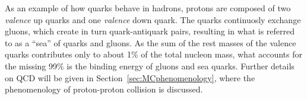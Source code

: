 As an example of how quarks behave in hadrons,
protons are composed of two {\it valence} up quarks
and one {\it valence} down quark. The quarks continuosly
exchange gluons, which create in turn quark-antiquark pairs,
resulting in what is referred to as a ``sea'' 
of quarks and gluons. 
As the sum of the rest masses of the valence quarks contributes 
only to about 1\% of the total nucleon
mass, what accounts for the missing 99\% is the
binding energy of gluons and sea quarks.
Further details on QCD will be given in Section~\ref{sec:MCphenomenology},
where the phenomenology of proton-proton collision
is discussed.
